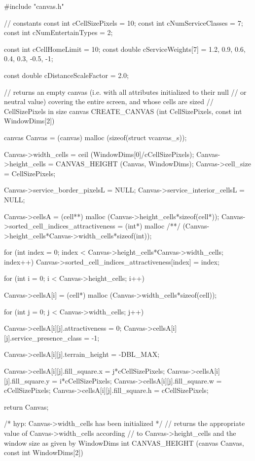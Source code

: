 \begin{C}
#include "canvas.h"

// constants
const int cCellSizePixels = 10;
const int cNumServiceClasses = 7;
const int cNumEntertainTypes = 2;

const int cCellHomeLimit = 10;
const double cServiceWeights[7] = {1.2, 0.9, 0.6, 0.4, 0.3, -0.5, -1};

const double cDistanceScaleFactor = 2.0;



// returns an empty canvas (i.e. with all attributes initialized to their null
// or neutral value) covering the entire screen, and whose cells are sized
// CellSizePixels in size
canvas CREATE_CANVAS (int CellSizePixels, const int WindowDims[2]){
	
	canvas Canvas = (canvas) malloc (sizeof(struct vcanvas_s));
	
	Canvas->width_cells = ceil (WindowDims[0]/cCellSizePixels);
	Canvas->height_cells = CANVAS_HEIGHT (Canvas, WindowDims);
	Canvas->cell_size = CellSizePixels;
	
	Canvas->service_border_pixelsL = NULL;
	Canvas->service_interior_cellsL = NULL;
	
	Canvas->cellsA = (cell**) malloc (Canvas->height_cells*sizeof(cell*));
	Canvas->sorted_cell_indices_attractiveness = (int*) malloc
	/**/ (Canvas->height_cells*Canvas->width_cells*sizeof(int));
	
	for (int index = 0; index < Canvas->height_cells*Canvas->width_cells; index++)
	Canvas->sorted_cell_indices_attractiveness[index] = index;
	
	for (int i = 0; i < Canvas->height_cells; i++){
		
		Canvas->cellsA[i] = (cell*) malloc (Canvas->width_cells*sizeof(cell));
		
		for (int j = 0; j < Canvas->width_cells; j++){
			
			Canvas->cellsA[i][j].attractiveness = 0;
			Canvas->cellsA[i][j].service_presence_class = -1;
			
			Canvas->cellsA[i][j].terrain_height = -DBL_MAX;
			
			Canvas->cellsA[i][j].fill_square.x = j*cCellSizePixels;
			Canvas->cellsA[i][j].fill_square.y = i*cCellSizePixels;
			Canvas->cellsA[i][j].fill_square.w = cCellSizePixels;
			Canvas->cellsA[i][j].fill_square.h = cCellSizePixels;
			
		}
	}
	
	return Canvas;
}


/* hyp: Canvas->width_cells has been initialized */
// returns the appropriate value of Canvas->width_cells according
// to Canvas->height_cells and the window size as given by WindowDims
int CANVAS_HEIGHT (canvas Canvas, const int WindowDims[2]){
	
}
\end{C}
